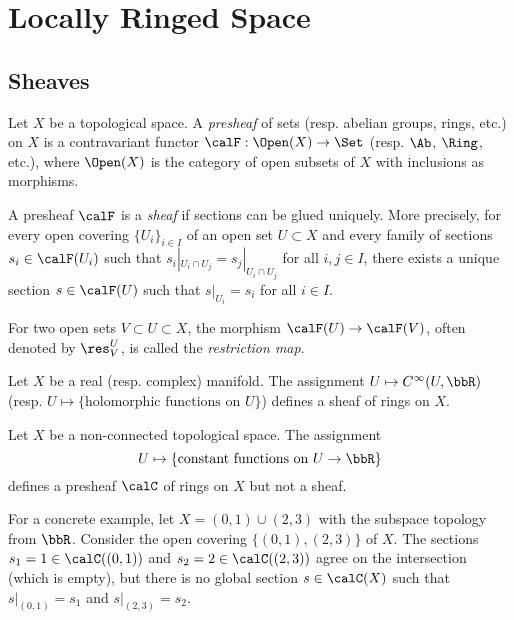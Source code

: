 \section{Locally Ringed Space}

\subsection{Sheaves}

    \begin{definition}\label{def:sheaves}
        Let \(X\) be a topological space.
        A \emph{presheaf} of sets (resp. abelian groups, rings, etc.) on \(X\) is a contravariant functor \(\calF : \Open(X) \to \Set\) (resp. \(\Ab\), \(\Ring\), etc.), 
        where \(\Open(X)\) is the category of open subsets of \(X\) with inclusions as morphisms.

        A presheaf \(\calF\) is a \emph{sheaf} if sections can be glued uniquely.
        More precisely, for every open covering \(\{U_i\}_{i \in I}\) of an open set \(U \subset X\) and every family of sections \(s_i \in \calF(U_i)\) such that \(s_i|_{U_i \cap U_j} = s_j|_{U_i \cap U_j}\) for all \(i,j \in I\),
        there exists a unique section \(s \in \calF(U)\) such that \(s|_{U_i} = s_i\) for all \(i \in I\).
    \end{definition}

    For two open sets \(V \subset U \subset X\), the morphism \(\calF(U) \to \calF(V)\), often denoted by \(\res^U_V\), is called the \emph{restriction map}.

    \begin{example}\label{eg:sheaf_of_smooth_and_analytic_functions}
        Let \(X\) be a real (resp. complex) manifold.
        The assignment \(U \mapsto C^\infty(U, \bbR)\) (resp. \(U \mapsto \{\text{holomorphic functions on }U\}\)) defines a sheaf of rings on \(X\).
    \end{example}

    \begin{example}\label{eg:presheaf_but_not_sheaf}
        Let \(X\) be a non-connected topological space.
        The assignment 
        \[U \mapsto \{\text{constant functions on }U \to \bbR\}\] 
        defines a presheaf \(\calC\) of rings on \(X\) but not a sheaf.

        For a concrete example, let \(X = (0,1)\cup (2,3)\) with the subspace topology from \(\bbR\).
        Consider the open covering \(\{(0,1), (2,3)\}\) of \(X\).
        The sections \(s_1 = 1 \in \calC((0,1))\) and \(s_2 = 2 \in \calC((2,3))\) agree on the intersection (which is empty), 
        but there is no global section \(s \in \calC(X)\) such that \(s|_{(0,1)} = s_1\) and \(s|_{(2,3)} = s_2\).
    \end{example}

